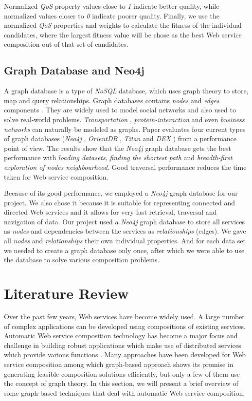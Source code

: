 Normalized \emph{QoS} property values close to \emph{1} indicate better quality, while normalized values closer to \emph{0} indicate poorer quality. Finally, we use the normalized \emph{QoS} properties and weights to calculate the fitness of the individual candidates, where the largest fitness value will be chose as the best Web service composition out of that set of candidates. 

\subsection{Graph Database and Neo4j}
A graph database is a type of \emph{NoSQL} database, which uses graph theory to store, map and query relationships. Graph databases contains \emph{nodes} and \emph{edges} components \cite{30}. They are widely used to model social networks and also used to solve real-world problems. \emph{Transportation} \cite{32}, \emph{protein-interaction} \cite{33} and even \emph{business networks} \cite{34} can naturally be modeled as graphs. Paper \cite{30} evaluates four current types of graph databases (\emph{Neo4j} \cite{6}, \emph{OrientDB} \cite{35}, \emph{Titan} \cite{36} and \emph{DEX} \cite{37})  from a performance point of view. The results show that the \emph{Neo4j} graph database gets the best performance with \emph{loading datasets}, \emph{finding the shortest path} and \emph{breadth-first exploration of nodes neighbourhood}. Good traversal performance reduces the time taken for Web service composition. \par

Because of its good performance, we employed a \emph{Neo4j} \cite{6} graph database for our project. We also chose it because it is suitable for representing connected and directed Web services and it allows for very fast retrieval, traversal and navigation of data. Our project used a \emph{Neo4j} graph database to store all services as \emph{nodes} and dependencies between the services as \emph{relationships} (edges). We gave all \emph{nodes} and \emph{relationships} their own individual properties. And for each data set we needed to create a graph database only once, after which we were able to use the database to solve various composition problems. \par

\section{Literature Review}
Over the past few years, Web services have become widely used. A large number of complex applications can be developed using compositions of existing services. Automatic Web service composition technology has become a major focus and challenge in building robust applications which make use of distributed services which provide various functions \cite{29}. Many approaches have been developed for Web service composition among which graph-based approach shows its promise in generating feasible composition solutions efficiently, but only a few of them use the concept of graph theory. In this section, we will present a brief overview of some graph-based techniques that deal with automatic Web service composition.
\par

